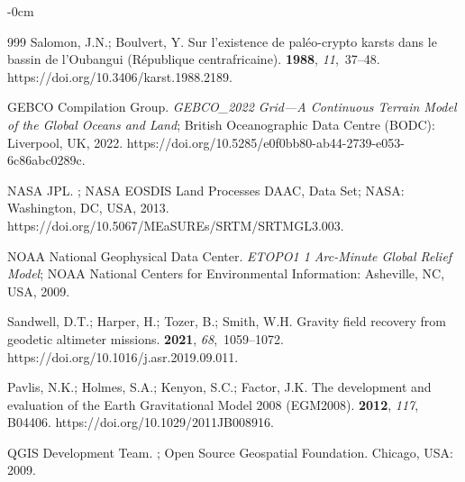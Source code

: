 \documentclass[minerals,article,accept,pdftex,moreauthors]{Definitions/mdpi}
\begin{document}
\begin{adjustwidth}{-\extralength}{0cm}
\begin{thebibliography}{999}
Salomon, J.N.; Boulvert, Y.
\newblock Sur l'existence de paléo-crypto karsts dans le bassin de l'Oubangui
  (République centrafricaine).
 {\bf 1988}, {\em 11},~37--48.
\newblock https://doi.org/10.3406/karst.1988.2189.

{GEBCO Compilation Group}.
\newblock \emph{{GEBCO\_2022 Grid}---A Continuous Terrain Model of the Global Oceans and Land};
\newblock British Oceanographic Data Centre (BODC): Liverpool, UK, 2022.
\newblock https://doi.org/10.5285/e0f0bb80-ab44-2739-e053-6c86abc0289c. %


{NASA JPL}.
;
\newblock NASA EOSDIS Land Processes DAAC, Data Set; NASA: Washington, DC, USA, 2013. https://doi.org/10.5067/MEaSUREs/SRTM/SRTMGL3.003. %

{NOAA National Geophysical Data Center}.
\newblock \emph{ETOPO1 1 Arc-Minute Global Relief Model};
\newblock NOAA National Centers for Environmental Information: Asheville, NC, USA, 2009. %

Sandwell, D.T.; Harper, H.; Tozer, B.; Smith, W.H.
\newblock Gravity field recovery from geodetic altimeter missions.
 {\bf 2021}, {\em 68},~1059--1072. %
\newblock  https://doi.org/10.1016/j.asr.2019.09.011.

Pavlis, N.K.; Holmes, S.A.; Kenyon, S.C.; Factor, J.K.
\newblock The development and evaluation of the Earth Gravitational Model 2008
  (EGM2008).
 {\bf 2012}, {\em
  117}, B04406.
\newblock https://doi.org/10.1029/2011JB008916. %

{QGIS Development Team}.
;
\newblock Open Source Geospatial Foundation. Chicago, USA:  2009. %


\end{thebibliography}
\end{adjustwidth}
\end{document}
